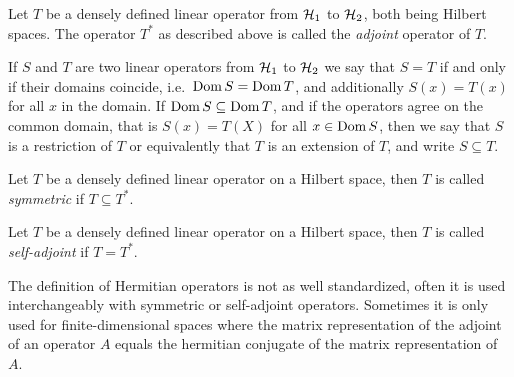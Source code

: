 \begin{definition}
  Let $T$ be a densely defined linear operator from $\mathcal{H}_1$ to $\mathcal{H}_2$, both being Hilbert spaces.
  The operator $T^*$ as described above is called the \emph{adjoint} operator of $T$.
\end{definition}

If $S$ and $T$ are two linear operators from $\mathcal{H}_1$ to $\mathcal{H}_2$ we say that $S = T$ if and only if their domains coincide, i.e.\ $\operatorname{Dom} S = \operatorname{Dom} T$, and additionally $S(x) = T(x)$ for all $x$ in the domain. If $\operatorname{Dom} S \subseteq \operatorname{Dom} T$, and if the operators agree on the common domain, that is $S(x) = T(X)$ for all $x \in \operatorname{Dom} S$, then we say that $S$ is a restriction of $T$ or equivalently that $T$ is an extension of $T$, and write $S \subseteq T$.

\begin{definition}
  Let $T$ be a densely defined linear operator on a Hilbert space, then $T$ is called \emph{symmetric} if $T \subseteq T^*$.
\end{definition}

\begin{definition}
  Let $T$ be a densely defined linear operator on a Hilbert space, then $T$ is called \emph{self-adjoint} if $T = T^*$.
\end{definition}




The definition of Hermitian operators is not as well standardized, often it is used interchangeably with symmetric or self-adjoint operators. Sometimes it is only used for finite-dimensional spaces where the matrix representation of the adjoint of an operator $A$ equals the hermitian conjugate of the matrix representation of $A$.

